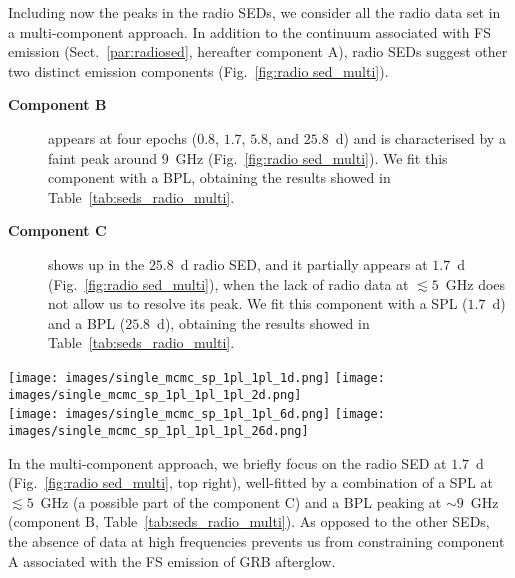 \documentclass{aa}
\begin{document}
Including now the peaks in the radio SEDs, we consider all the radio data set in a multi-component approach.
In addition to the continuum associated with FS emission (Sect.~\ref{par:radiosed}, hereafter component A), radio SEDs suggest other two distinct emission components (Fig.~\ref{fig:radio sed_multi}).
%
\begin{description}
\item[\textbf{Component B}] appears at four epochs ($0.8$, $1.7$, $5.8$, and $25.8$~d) and is characterised by a faint peak around $9$~GHz (Fig.~\ref{fig:radio sed_multi}).
We fit this component with a BPL, obtaining the results showed in Table~\ref{tab:seds_radio_multi}.
%
\item[\textbf{Component C}] shows up in the $25.8$~d radio SED, and it partially appears at $1.7$~d (Fig.~\ref{fig:radio sed_multi}), when the lack of radio data at $\lesssim 5$~GHz does not allow us to resolve its peak.
We fit this component with a SPL ($1.7$~d) and a BPL ($25.8$~d), obtaining the results showed in Table~\ref{tab:seds_radio_multi}.
\end{description}
%
\begin{figure*} %
\centering
{\texttt{[image: images/single\_mcmc\_sp\_1pl\_1pl\_1d.png]}} \quad
{\texttt{[image: images/single\_mcmc\_sp\_1pl\_1pl\_1pl\_2d.png]}} \\
{\texttt{[image: images/single\_mcmc\_sp\_1pl\_1pl\_6d.png]}} \quad
{\texttt{[image: images/single\_mcmc\_sp\_1pl\_1pl\_1pl\_26d.png]}} \\
\caption{Radio SEDs of GRB\,160131A from $0.8$ to $25.8$~d in multi-component approach.
Top left: data together with a sum between two BPLs at $0.8$~d.
Top right: radio data at $1.7$~d together with a sum between a SPL and a two BPLs.
Bottom left: data together with a sum between a SPL and a BPL at $5.8$~d.
Bottom right: radio SED at $25.8$~d fitted with a sum between a SPL and two BPLs.
Black lines show the resulting modelling, and green dash-dot or dotted lines indicate each component.
Filled circles indicate detections, and upside down triangles indicate $3\sigma$ upper limits.
}
\label{fig:radio sed_multi}
\end{figure*}
%
In the multi-component approach, we briefly focus on the radio SED at $1.7$~d (Fig.~\ref{fig:radio sed_multi}, top right), well-fitted by a combination of a SPL at $\lesssim 5$~GHz (a possible part of the component C) and a BPL peaking at $\sim 9$~GHz (component B, Table~\ref{tab:seds_radio_multi}).
As opposed to the other SEDs, the absence of data at high frequencies prevents us from constraining component A associated with the FS emission of GRB afterglow.
\end{document}
